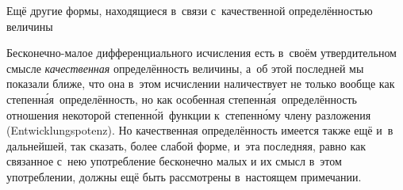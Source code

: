 \subsubremark%
{Ещё другие формы, находящиеся в~связи с~качественной
определённостью величины}

\label{bkm:bm53a}
Бесконечно-малое дифференциального исчисления есть в~своём утвердительном
смысле {\em качественная} определённость величины, а~об этой последней мы
показали ближе, что она в~этом исчислении наличествует не только вообще как
степенн\'{а}я~определённость, но как особенная степенн\'{а}я~определённость
отношения некоторой степенн\'{о}й~функции к~степенн\'{о}му члену разложения
(Ent\-wick\-lungs\-potenz). Но качественная
определённость имеется также ещё и~в дальнейшей, так сказать, более слабой
форме, и~эта последняя, равно как связанное с~нею употребление бесконечно малых
и их смысл в~этом употреблении, должны ещё быть рассмотрены в~настоящем
примечании.

